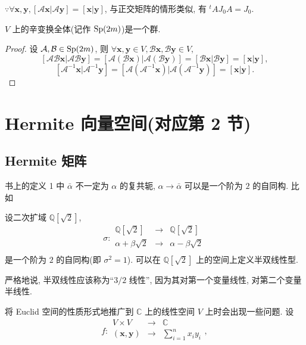 \documentclass{ctexart}
\begin{document}
$\because\forall\boldsymbol{x},\boldsymbol{y},[\mathcal{A}\boldsymbol{x}|\mathcal{A}\boldsymbol{y}]=[\boldsymbol{x}|\boldsymbol{y}]$, 与正交矩阵的情形类似, 有 ${}^tAJ_0A=J_0$.
\begin{theorem}
    $V$ 上的辛变换全体(记作 $\operatorname{Sp} (2m)$)是一个群.
\end{theorem}
\begin{proof}
    设 $\mathcal{A},\mathcal{B}\in\operatorname{Sp} (2m)$, 则 $\forall\boldsymbol{x},\boldsymbol{y}\in V,\mathcal{B}\boldsymbol{x},\mathcal{B}\boldsymbol{y}\in V,$
    \[[\mathcal{AB}\boldsymbol{x}|\mathcal{AB}\boldsymbol{y}]=[\mathcal{A}(\mathcal{B}\boldsymbol{x})|\mathcal{A}(\mathcal{B}\boldsymbol{y})]=[\mathcal{B}\boldsymbol{x}|\mathcal{B}\boldsymbol{y}]=[\boldsymbol{x}|\boldsymbol{y}],\]
    \[[\mathcal{A}^{-1}\boldsymbol{x}|\mathcal{A}^{-1}\boldsymbol{y}]=[\mathcal{A}(\mathcal{A}^{-1}\boldsymbol{x})|\mathcal{A}(\mathcal{A}^{-1}\boldsymbol{y})]=[\boldsymbol{x}|\boldsymbol{y}].\]
\end{proof}
\section{Hermite 向量空间(对应第 2 节)}
\subsection{Hermite 矩阵}
书上的定义 1 中 $\bar{\alpha}$ 不一定为 $\alpha$ 的复共轭, $\alpha\to\bar{\alpha}$ 可以是一个阶为 $2$ 的自同构. 比如
\begin{example}
    设二次扩域 $\mathbb{Q}[\sqrt{2}]$,
    \[\sigma:\begin{array}{rcl}
        \mathbb{Q}[\sqrt{2}] & \to & \mathbb{Q}[\sqrt{2}] \\
        \alpha+\beta\sqrt{2} & \to & \alpha-\beta\sqrt{2} \\
    \end{array}\]
    是一个阶为 $2$ 的自同构(即 $\sigma^2=1$). 可以在 $\mathbb{Q}[\sqrt{2}]$ 上的空间上定义半双线性型.
\end{example}
严格地说, 半双线性应该称为``$3/2$ 线性'', 因为其对第一个变量线性, 对第二个变量半线性.

将 Euclid 空间的性质形式地推广到 $\mathbb{C}$ 上的线性空间 $V$ 上时会出现一些问题. 设
\[f:\begin{array}{rcl}
    V\times V & \to & \mathbb{C} \\
    (\boldsymbol{x},\boldsymbol{y}) & \to & \sum\limits_{i=1}^nx_iy_i \\
\end{array},\]
\end{document}
